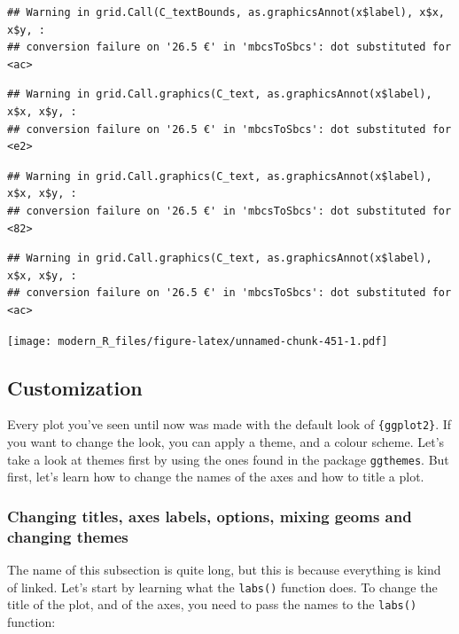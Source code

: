 \documentclass[
]{article}
\begin{document}
\begin{verbatim}
## Warning in grid.Call(C_textBounds, as.graphicsAnnot(x$label), x$x, x$y, :
## conversion failure on '26.5 €' in 'mbcsToSbcs': dot substituted for <ac>
\end{verbatim}

\begin{verbatim}
## Warning in grid.Call.graphics(C_text, as.graphicsAnnot(x$label), x$x, x$y, :
## conversion failure on '26.5 €' in 'mbcsToSbcs': dot substituted for <e2>
\end{verbatim}

\begin{verbatim}
## Warning in grid.Call.graphics(C_text, as.graphicsAnnot(x$label), x$x, x$y, :
## conversion failure on '26.5 €' in 'mbcsToSbcs': dot substituted for <82>
\end{verbatim}

\begin{verbatim}
## Warning in grid.Call.graphics(C_text, as.graphicsAnnot(x$label), x$x, x$y, :
## conversion failure on '26.5 €' in 'mbcsToSbcs': dot substituted for <ac>
\end{verbatim}

\texttt{[image: modern\_R\_files/figure-latex/unnamed-chunk-451-1.pdf]}

\hypertarget{customization}{%
\subsection{Customization}\label{customization}}

Every plot you've seen until now was made with the default look of \texttt{\{ggplot2\}}. If you want to change
the look, you can apply a theme, and a colour scheme. Let's take a look at themes first by using the
ones found in the package \texttt{ggthemes}. But first, let's learn how to change the names of the axes
and how to title a plot.

\hypertarget{changing-titles-axes-labels-options-mixing-geoms-and-changing-themes}{%
\subsubsection{Changing titles, axes labels, options, mixing geoms and changing themes}\label{changing-titles-axes-labels-options-mixing-geoms-and-changing-themes}}

The name of this subsection is quite long, but this is because everything is kind of linked. Let's
start by learning what the \texttt{labs()} function does. To change the title of the plot, and of the axes,
you need to pass the names to the \texttt{labs()} function:
\end{document}
